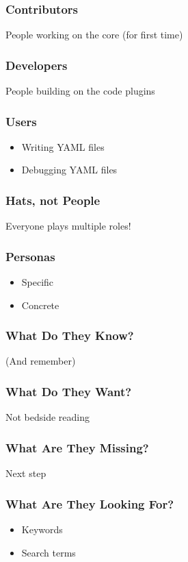 \begin{frame}
\frametitle{Contributors}

People working on the core \pause (for first time)
\end{frame}

\begin{frame}
\frametitle{Developers}

People building on the code \pause plugins
\end{frame}

\begin{frame}
\frametitle{Users}

\begin{itemize}
\item Writing YAML files
\item Debugging YAML files
\end{itemize}

\end{frame}

\begin{frame}
\frametitle{Hats, not People}

Everyone plays multiple roles!
\end{frame}

\begin{frame}
\frametitle{Personas}

\begin{itemize}
\item Specific
\item Concrete
\end{itemize}

\end{frame}

\begin{frame}
\frametitle{What Do They Know?}

(And remember)
\end{frame}

\begin{frame}
\frametitle{What Do They Want?}

Not bedside reading
\end{frame}

\begin{frame}
\frametitle{What Are They Missing?}

Next step
\end{frame}

\begin{frame}
\frametitle{What Are They Looking For?}

\begin{itemize}
\item Keywords
\item Search terms
\end{itemize}
\end{frame}

